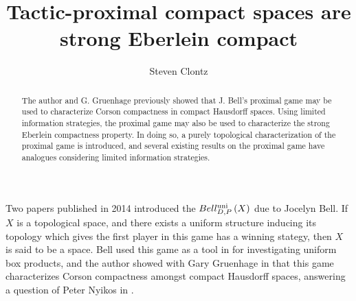 \documentclass{amsart}
\theoremstyle{definition}
\begin{document}
\title{Tactic-proximal compact spaces are strong Eberlein compact}




\author{Steven Clontz}
\address{Department of Mathematics, Auburn University,
Auburn, AL 36830}




\begin{abstract}
  The author and G. Gruenhage previously showed that J. Bell's proximal game
  may be used to characterize Corson compactness in compact Hausdorff spaces.
  Using limited information strategies, the proximal game may also be
  used to characterize the strong Eberlein compactness property.
  In doing so, a purely topological characterization of the proximal game
  is introduced, and several existing results on
  the proximal game have analogues considering limited information strategies.
\end{abstract}


\maketitle

  Two papers published in 2014 introduced the
  \(Bell_{D,P}^{\textrm{uni}}\left({X}\right)\) due to Jocelyn Bell. If \(X\) is a
  topological space, and there exists a uniform structure inducing its topology
  which gives the first player in this game has a winning stategy,
  then \(X\) is said to be a  space. Bell used this
  game as a tool in \cite{MR3239205} for investigating uniform box products,
  and the author showed with Gary Gruenhage in \cite{MR3227201} that
  this game characterizes Corson compactness amongst compact Hausdorff spaces,
  answering a question of Peter Nyikos in \cite{nyikosProximalPreprint}.
\end{document}
